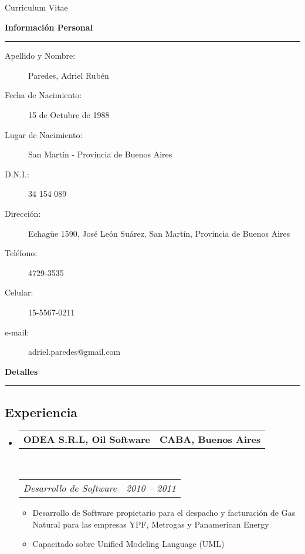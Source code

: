 \documentclass[11pt,4apaper]{article}
\makeatletter
\newcommand{\headerrow}[2]
{\begin{tabular*}{\linewidth}{l@{\extracolsep{\fill}}r}
#1 &
#2 \\
    \end{tabular*}}
\makeatother
\begin{document}
\begin{titlepage}
\vspace*{\fill}
\begin{center}
\Huge{Curriculum Vitae}
\end{center}
\vspace*{\fill}
\end{titlepage}
\newpage


\begin{center}
{\LARGE \textbf{Información Personal}}
\end{center}
\hrule
\vspace{-0.4em}

\begin{description}
\item [Apellido y Nombre:] Paredes, Adriel Rubén 
\item [Fecha de Nacimiento:] 15 de Octubre de 1988
\item [Lugar de Nacimiento:] San Martín - Provincia de Buenos Aires
\item [D.N.I.:] 34 154 089
\item [Dirección:] Echagüe 1590, José León Suárez, San Martín,
    Provincia de Buenos Aires
    \item [Teléfono:] 4729-3535
    \item [Celular:] 15-5567-0211
    \item [e-mail:] adriel.paredes@gmail.com
    \end{description}




    \begin{center}
{\LARGE \textbf{Detalles}}
\end{center}

\hrule
\vspace{-0.4em}

\subsection*{Experiencia}

\begin{itemize}
\parskip=0.1em

\item
\headerrow
{\textbf{ODEA S.R.L, Oil Software}}
{\textbf{CABA, Buenos Aires}}
\\
        \headerrow
{\emph{Desarrollo de Software}}
{\emph{2010 -- 2011}}
\begin{itemize}
\item Desarrollo de Software propietario para el despacho y facturación de
    Gas Natural para las empresas YPF, Metrogas y Panamerican Energy
\item Capacitado sobre Unified Modeling Language (UML)
    \end{itemize}

    \end{itemize}
\end{document}
